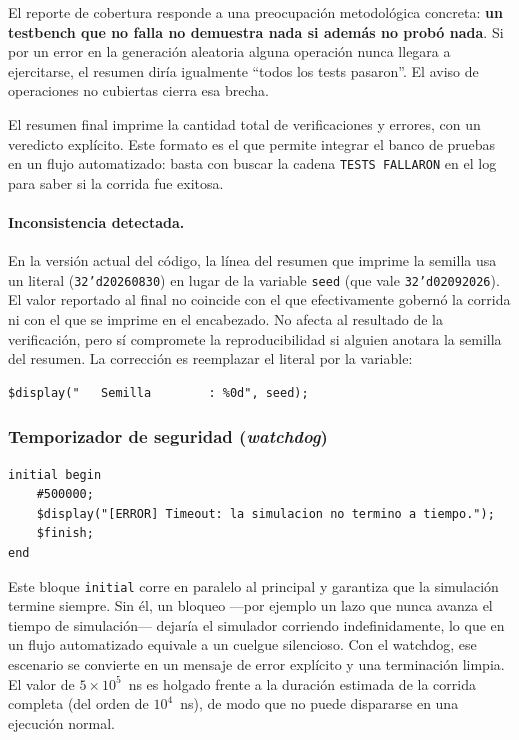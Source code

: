 \documentclass[12pt,a4paper]{article}
\begin{document}
El reporte de cobertura responde a una preocupación metodológica concreta:
\textbf{un testbench que no falla no demuestra nada si además no probó nada}. Si
por un error en la generación aleatoria alguna operación nunca llegara a
ejercitarse, el resumen diría igualmente ``todos los tests pasaron''. El aviso
de operaciones no cubiertas cierra esa brecha.

El resumen final imprime la cantidad total de verificaciones y errores, con un
veredicto explícito. Este formato es el que permite integrar el banco de pruebas
en un flujo automatizado: basta con buscar la cadena \texttt{TESTS FALLARON} en
el log para saber si la corrida fue exitosa.

\paragraph{Inconsistencia detectada.} En la versión actual del código, la línea
del resumen que imprime la semilla usa un literal (\texttt{32'd20260830}) en
lugar de la variable \texttt{seed} (que vale \texttt{32'd02092026}). El valor
reportado al final no coincide con el que efectivamente gobernó la corrida ni
con el que se imprime en el encabezado. No afecta al resultado de la
verificación, pero sí compromete la reproducibilidad si alguien anotara la
semilla del resumen. La corrección es reemplazar el literal por la variable:

\begin{lstlisting}
$display("   Semilla        : %0d", seed);
\end{lstlisting}

\subsubsection{Temporizador de seguridad (\emph{watchdog})}

\begin{lstlisting}[caption={Bloque de timeout.}]
initial begin
    #500000;
    $display("[ERROR] Timeout: la simulacion no termino a tiempo.");
    $finish;
end
\end{lstlisting}

Este bloque \texttt{initial} corre en paralelo al principal y garantiza que la
simulación termine siempre. Sin él, un bloqueo —por ejemplo un lazo que nunca
avanza el tiempo de simulación— dejaría el simulador corriendo indefinidamente,
lo que en un flujo automatizado equivale a un cuelgue silencioso. Con el
watchdog, ese escenario se convierte en un mensaje de error explícito y una
terminación limpia. El valor de $5 \times 10^5$~ns es holgado frente a la
duración estimada de la corrida completa (del orden de $10^4$~ns), de modo que
no puede dispararse en una ejecución normal.
\end{document}
